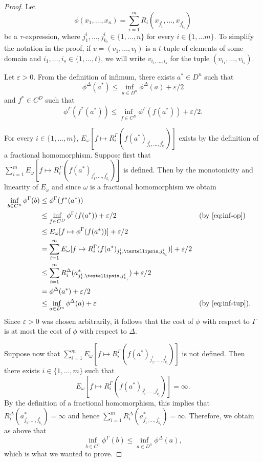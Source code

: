 \documentclass[nonacm]{acmart}
\begin{document}
\begin{proof}
Let 
\[\phi(x_1,\dots,x_n) = \sum_{i=1}^m R_i(x_{j_1^i}, \dots, x_{j_{k_i}^i})\]
be a $\tau$-expression, where $j_1^i, \dots, j_{k_i}^i \in \{1, \dots, n\}$ for every $i \in \{1, \dots m\}$. To simplify the notation in the proof, if $v=(v_1, \dots, v_t)$ is a $t$-tuple of elements of some domain and $i_1,\dots, i_s \in \{1, \dots, t\}$, we will write $v_{i_1, \dots, i_s}$ for the tuple $(v_{i_1}, \dots, v_{i_s})$.

Let $\varepsilon > 0$. From the definition of infimum, there exists $a^*\in D^n$ such that 
\begin{equation}\label{eq:inf-tup}
    \phi^{\Delta}(a^*) \leq \inf_{a \in D^n} \phi^{\Delta}(a)+ \varepsilon/2
\end{equation} and $f^* \in C^D$ such that
\begin{equation}\label{eq:inf-op}
    \phi^{\Gamma}(f^*(a^*)) \leq \inf_{f\in C^D} \phi^{\Gamma} (f(a^*)) + \varepsilon/2.
\end{equation}

For every $i \in \{1, \dots, m\}$, $E_{\omega}[f \mapsto R_i^{\Gamma}(f(a^*)_{j_1^i, \dots, j_{k_i}^i})]$ exists  by the definition of a fractional homomorphism. Suppose first that $\sum_{i=1}^m E_{\omega}[f \mapsto R_i^{\Gamma}(f(a^*)_{j_1^i, \dots, j_{k_i}^i})]$ is defined.
Then by the monotonicity and linearity of $E_\omega$ and since $\omega$ is a fractional homomorphism we obtain 
\begin{align*}
    \inf_{b \in C^n} \phi^{\Gamma}(b) &\leq \phi^{\Gamma} (f^*(a^*)) \\
    & \leq \inf_{f \in C^D} \phi^{\Gamma} (f(a^*)) + \varepsilon/2  &&\text{(by \eqref{eq:inf-op}) }\\
    & \leq E_{\omega}[f \mapsto \phi^{\Gamma}(f(a^*))] + \varepsilon/2 \\
    &= \sum_{i=1}^m E_{\omega}[f \mapsto R_i^{\Gamma}(f(a^*)_{j_1^i, \dots, j_{k_i}^i})] + \varepsilon/2 \\
    & \leq \sum_{i=1}^m R_i^{\Delta}(a^*_{j_1^i, \dots, j_{k_i}^i}) + \varepsilon/2 \\
    &= \phi^{\Delta}(a^*) + \varepsilon/2  \\
    & \leq \inf_{a \in D^n} \phi^{\Delta}(a) + \varepsilon
    &&\text{(by \eqref{eq:inf-tup}).}
\end{align*}
Since $\varepsilon>0$ was chosen arbitrarily, it follows that the cost of $\phi$ with respect to $\Gamma$ is at most the cost of $\phi$ with respect to $\Delta$.

Suppose now that $\sum_{i=1}^m E_{\omega}[f \mapsto R_i^{\Gamma}(f(a^*)_{j_1^i, \dots, j_{k_i}^i})]$ is not defined. Then there exists $i \in \{1,\dots, m\}$ such that
\[E_\omega[f \mapsto R_i^\Gamma(f(a^*)_{j_1^i, \dots, j_{k_i}^i})] = \infty.\]
By the definition of a fractional homomorphism, this implies that $R_i^\Delta(a^*_{j_1^i, \dots, j_{k_i}^i})= \infty$ and hence $\sum_{i=1}^m R_i^{\Delta}(a^*_{j_1^i, \dots, j_{k_i}^i})=\infty$. Therefore, we obtain as above that \[\inf_{b \in C^n} \phi^{\Gamma}(b) \leq\inf_{a \in D^n} \phi^{\Delta}(a),\] which is what we wanted to prove. 
\end{proof}
\end{document}
